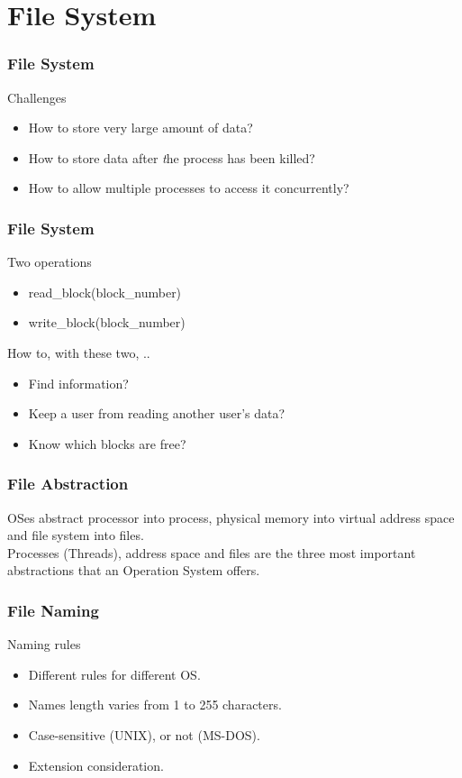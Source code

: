 \section{File System}

\begin{frame}
  \frametitle{File System}
  \begin{block}{Challenges}
    \begin{itemize}
      \item How to store very large amount of data?
      \item How to store data after {\emph the} process has been killed?
      \item How to allow multiple processes to access it concurrently?
    \end{itemize}
  \end{block}
\end{frame}

\begin{frame}
  \frametitle{File System}
  \begin{block}{Two operations}
    \begin{itemize}
      \item read\_block(block\_number)
      \item write\_block(block\_number)
    \end{itemize}
  \end{block} \pause
  \begin{block}{How to, with these two, ..}
    \begin{itemize}
      \item Find information?
      \item Keep a user from reading another user's data?
      \item Know which blocks are free?
    \end{itemize}
  \end{block}
\end{frame}

\begin{frame}
  \frametitle{File Abstraction}
  OSes abstract processor into process, physical memory into virtual address space and file system into files. \\
  Processes (Threads), address space and files are the three most important abstractions that an Operation System offers.
\end{frame}

\begin{frame}
  \frametitle{File Naming}
  \begin{block}{Naming rules}
    \begin{itemize}
      \item Different rules for different OS.
      \item Names length varies from 1 to 255 characters.
      \item Case-sensitive (UNIX), or not (MS-DOS).
      \item Extension consideration.
    \end{itemize}
  \end{block}
\end{frame}

